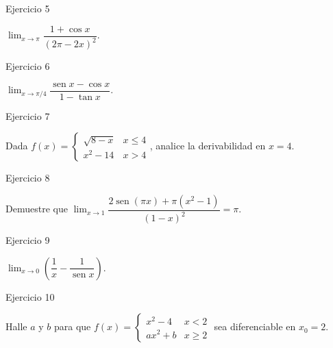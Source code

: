 \documentclass[aspectratio=169]{beamer}
\begin{document}
\begin{frame}{Ejercicio 5}
  \begin{mwejercicio}
    $\lim_{x\to\pi}\dfrac{1 + \cos x}{(2\pi - 2x)^2}$.
  \end{mwejercicio}
\end{frame}

\begin{frame}{Ejercicio 6}
  \begin{mwejercicio}
    $\lim_{x\to\pi/4}\dfrac{\operatorname{sen}x - \cos x}{1 - \tan x}$.
  \end{mwejercicio}
\end{frame}

\begin{frame}{Ejercicio 7}
  \begin{mwejercicio}
    Dada $f(x) = \begin{cases} \sqrt{8-x} & x \le 4 \\ x^2 - 14 & x > 4 \end{cases}$, analice la derivabilidad en $x=4$.
  \end{mwejercicio}
\end{frame}

\begin{frame}{Ejercicio 8}
  \begin{mwejercicio}
    Demuestre que $\lim_{x\to1}\dfrac{2\operatorname{sen}(\pi x) + \pi(x^2-1)}{(1-x)^2} = \pi$.
  \end{mwejercicio}
\end{frame}

\begin{frame}{Ejercicio 9}
  \begin{mwejercicio}
    $\lim_{x\to0}\left(\dfrac{1}{x} - \dfrac{1}{\operatorname{sen} x}\right)$.
  \end{mwejercicio}
\end{frame}

\begin{frame}{Ejercicio 10}
  \begin{mwejercicio}
    Halle $a$ y $b$ para que $f(x) = \begin{cases} x^2 - 4 & x < 2 \\ ax^2 + b & x \ge 2 \end{cases}$ sea diferenciable en $x_0 = 2$.
  \end{mwejercicio}
\end{frame}
\end{document}
